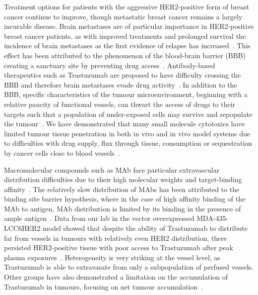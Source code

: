 Treatment options for patients with the aggressive \acs{HER2}-positive form of breast cancer continue to improve, though metastatic breast cancer remains a largely incurable disease.
Brain metastases are of particular importance in \acs{HER2}-positive breast cancer patients, as with improved treatments and prolonged survival the incidence of brain metastases as the first evidence of relapse has increased~\cite{Seal:2012cn,Bria:2007gc}.
This effect has been attributed to the phenomenon of the blood-brain barrier (\acs{BBB}) creating a sanctuary site by preventing drug access~\cite{Kaplan:2014es,Lai:2004bd}.
Antibody-based therapeutics such as Trastuzumab are proposed to have difficulty crossing the \acs{BBB} and therefore brain metastases evade drug activity~\cite{Seal:2012cn,Murrell:2015bz,Stemmler:2006}.
In addition to the \acs{BBB}, specific characteristics of the tumour microenvironment, beginning with a relative paucity of functional vessels, can thwart the access of drugs to their targets such that a population of under-exposed cells may survive and repopulate the tumour~\cite{Minchinton:2006gs}.
We have demonstrated that many small molecule cytotoxics have limited tumour tissue penetration in both in vivo and in vivo model systems due to difficulties with drug supply, flux through tissue, consumption or sequestration by cancer cells close to blood vessels~\cite{Kyle:2014cy,Kyle:2007ch,Huxham:2004hm,Kyle:2004fo,Kyle:1999kr}.

Macromolecular compounds such as \acs{MAb} face particular extravascular distribution difficulties due to their high molecular weights and target-binding affinity~\cite{Jain:2010ie,Chauhan:2011fi}.
The relatively slow distribution of \acs{MAbs} has been attributed to the binding site barrier hypothesis, where in the case of high affinity binding of the \acs{MAb} to antigen, \acs{MAb} distribution is limited by its binding in the presence of ample antigen~\cite{Juweid:1992ty}.
Data from our lab in the vector overexpressed MDA-435-LCC6\acs{HER2} model showed that despite the ability of Trastuzumab to distribute far from vessels in tumours with relatively even \acs{HER2} distribution, there persisted \acs{HER2}-positive tissue with poor access to Trastuzumab after peak plasma exposures~\cite{Baker:2008ci}.
Heterogeneity is very striking at the vessel level, as Trastuzumab is able to extravasate from only a subpopulation of perfused vessels.
Other groups have also demonstrated a limitation on the accumulation of Trastuzumab in tumours, focusing on net tumour accumulation~\cite{Jain:2010ie,Chauhan:2011fi,Lee:2010gb}.


